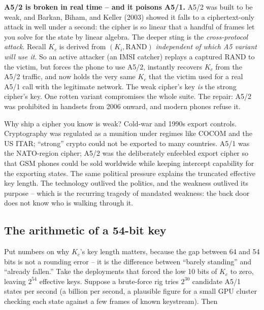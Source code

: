 \begin{attackbox}
\textbf{A5/2 is broken in real time -- and it poisons A5/1.} A5/2 was built to be weak, and Barkan, Biham, and Keller (2003) showed it falls to a ciphertext-only attack in well under a second: the cipher is so linear that a handful of frames let you solve for the state by linear algebra. The deeper sting is the \emph{cross-protocol attack}. Recall $K_c$ is derived from $(K_i,\text{RAND})$ \emph{independent of which A5 variant will use it}. So an active attacker (an IMSI catcher) replays a captured RAND to the victim, but forces the phone to use A5/2, instantly recovers $K_c$ from the A5/2 traffic, and now holds the very same $K_c$ that the victim used for a real A5/1 call with the legitimate network. The weak cipher's key \emph{is} the strong cipher's key. One rotten variant compromises the whole suite. The repair: A5/2 was prohibited in handsets from 2006 onward, and modern phones refuse it.
\end{attackbox}

\begin{historybox}
Why ship a cipher you know is weak? Cold-war and 1990s export controls. Cryptography was regulated as a munition under regimes like COCOM and the US ITAR; ``strong'' crypto could not be exported to many countries. A5/1 was the NATO-region cipher; A5/2 was the deliberately enfeebled export cipher so that GSM phones could be sold worldwide while keeping intercept capability for the exporting states. The same political pressure explains the truncated effective key length. The technology outlived the politics, and the weakness outlived its purpose -- which is the recurring tragedy of mandated weakness: the back door does not know who is walking through it.
\end{historybox}

\subsection{The arithmetic of a 54-bit key}
\label{ch29:a5-numbers}

Put numbers on why $K_c$'s key length matters, because the gap between 64 and 54 bits is not a rounding error -- it is the difference between ``barely standing'' and ``already fallen.'' Take the deployments that forced the low 10 bits of $K_c$ to zero, leaving $2^{54}$ effective keys. Suppose a brute-force rig tries $2^{30}$ candidate A5/1 states per second (a billion per second, a plausible figure for a small GPU cluster checking each state against a few frames of known keystream). Then

